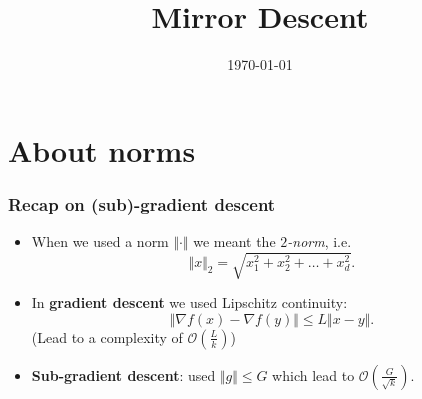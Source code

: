 \documentclass{beamer}
\title{Mirror Descent}
\date{\today}
\begin{document}
\maketitle
\frame{\tableofcontents}

\section{About norms}

\begin{frame}
  \frametitle{Recap on (sub)-gradient descent}

  \begin{itemize}
    \item When we used a norm $\Vert \cdot \Vert$ we meant the \emph{$2$-norm}, i.e.\
          \begin{equation}
            \Vert x \Vert_2 = \sqrt{x_1^2 + x_2^2 + \dots + x_d^2 }. %
          \end{equation}
    \item In \textbf{gradient descent} we used Lipschitz continuity:
          \begin{equation}
            \Vert \nabla f(x) - \nabla f(y) \Vert \le L \Vert x-y \Vert.
          \end{equation}
          (Lead to a complexity of $\mathcal{O}(\frac{L}{k})$) \\

    \item \textbf{Sub-gradient descent}: used $\Vert g \Vert \le G$ which lead to $\mathcal{O}(\frac{G}{\sqrt{k}})$.

  \end{itemize}
\end{frame}
\end{document}
